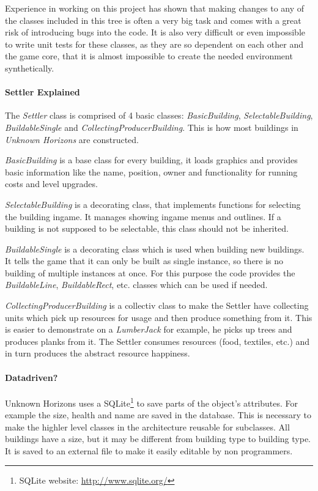Experience in working on this project has shown that making changes to any of the classes included in this tree is often
a very big task and comes with a great risk of introducing bugs into the code. It is also very difficult or even
impossible to write unit tests for these classes, as they are so dependent on each other and the game core, that it is
almost impossible to create the needed environment synthetically.

\paragraph{Settler Explained}
The \textit{Settler} class is comprised of 4 basic classes: \textit{BasicBuilding}, \textit{SelectableBuilding},
\textit{BuildableSingle} and \textit{CollectingProducerBuilding}. This is how most buildings in \textit{Unknown
Horizons} are constructed. 

\textit{BasicBuilding} is a base class for every building, it loads graphics and provides
basic information like the name, position, owner and functionality for running costs and level upgrades.

\textit{SelectableBuilding} is a decorating class, that implements functions for selecting the building ingame. It
manages showing ingame menus and outlines. If a building is not supposed to be selectable, this class should not be
inherited.

\textit{BuildableSingle} is a decorating class which is used when building new buildings. It tells the game that it can
only be built as single instance, so there is no building of multiple instances at once. For this purpose the code
provides the \textit{BuildableLine}, \textit{BuildableRect}, etc. classes which can be used if needed.

\textit{CollectingProducerBuilding} is a collectiv class to make the Settler have collecting units which pick up
resources for usage and then produce something from it. This is easier to demonstrate on a \textit{LumberJack} for
example, he picks up trees and produces planks from it. The Settler consumes resources (food, textiles, etc.) and in
turn produces the abstract resource happiness.

\paragraph{Datadriven?}
Unknown Horizons uses a SQLite\footnote{SQLite website: \url{http://www.sqlite.org/}} to save parts of the object's
attributes. For example the size, health and name are saved in the database. This is necessary to make the highler level
classes in the architecture reusable for subclasses. All buildings have a size, but it may be different from building
type to building type. It is saved to an external file to make it easily editable by non programmers.

